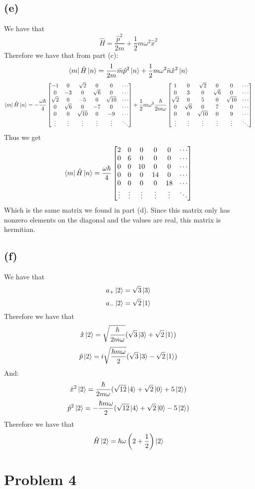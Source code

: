 \documentclass[11pt]{article}
\begin{document}
\subsection*{(e)}
We have that
$$\hat{H}=\frac{\hat{p}^2}{2m}+\frac{1}{2}
m\omega^2\hat{x}^2$$
Therefore we have that from part (c):
$$\bra{m}\hat{H}\ket{n}=
\frac{1}{2m}\bar{m}\hat{p}^2\ket{n}+
\frac{1}{2}m\omega^2\bar{n}\hat{x}^2\ket{n}$$
$$\bra{m}\hat{H}\ket{n}=-\frac{\omega\hbar}{4}
\begin{bmatrix}
    -1 & 0 & \sqrt{2} & 0 & 0 & \cdots \\
    0 & -3 & 0 & \sqrt{6} & 0 & \cdots \\
    \sqrt{2} & 0 & -5 & 0 & \sqrt{10} & \cdots \\
    0 & \sqrt{6} & 0 & -7 & 0 & \cdots \\
    0 & 0 & \sqrt{10} & 0 & -9 & \cdots \\
    \vdots & \vdots & \vdots & \vdots & \vdots & \ddots
\end{bmatrix}
+\frac{1}{2}m\omega^2\frac{\hbar}{2m\omega}
\begin{bmatrix}
    1 & 0 & \sqrt{2} & 0 & 0 & \cdots \\
    0 & 3 & 0 & \sqrt{6} & 0 & \cdots \\
    \sqrt{2} & 0 & 5 & 0 & \sqrt{10} & \cdots \\
    0 & \sqrt{6} & 0 & 7 & 0 & \cdots \\
    0 & 0 & \sqrt{10} & 0 & 9 & \cdots \\
    \vdots & \vdots & \vdots & \vdots & \vdots & \ddots
\end{bmatrix}
$$
Thus we get 
$$
\bra{m}\hat{H}\ket{n}
=\frac{\omega\hbar}{4}
\begin{bmatrix}
    2 & 0 & 0 & 0 & 0 & \cdots \\
    0 & 6 & 0 & 0 & 0 & \cdots \\
    0 & 0 & 10 & 0 & 0 & \cdots \\
    0 & 0 & 0 & 14 & 0 & \cdots \\
    0 & 0 & 0 & 0 & 18 & \cdots \\
    \vdots & \vdots & \vdots & \vdots & \vdots & \ddots
\end{bmatrix}$$
Which is the same matrix we found in part (d). Since this 
matrix only has nonzero elements on the diagonal and the
values are real, this matrix is hermitian.
\subsection*{(f)}
We have that 
$$a_{+}\ket{2}=\sqrt{3}\ket{3}$$
$$a_{-}\ket{2}=\sqrt{2}\ket{1}$$
Therefore we have that 
$$\hat{x}\ket{2}=\sqrt{\frac{\hbar}{2m\omega}}(\sqrt{3}\ket{3}+\sqrt{2}\ket{1})$$
$$\hat{p}\ket{2}=i\sqrt{\frac{\hbar m\omega}{2}}(\sqrt{3}\ket{3}-\sqrt{2}\ket{1})$$
And:
$$\hat{x}^2\ket{2}=\frac{\hbar}{2m\omega}(\sqrt{12}\ket{4}
+\sqrt{2}\ket{0}+5\ket{2})$$
$$\hat{p}^2\ket{2}=-\frac{\hbar m\omega}{2}(\sqrt{12}\ket{4}
+\sqrt{2}\ket{0}-5\ket{2})$$
Therefore we have that 
$$\hat{H}\ket{2}=
\hbar\omega\left(2+\frac{1}{2}\right)\ket{2}$$
\section*{Problem 4}
\end{document}

